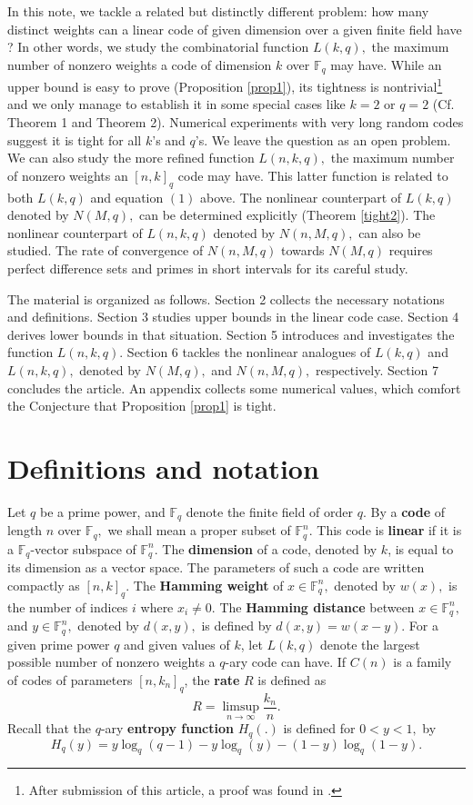 \documentclass[12pt]{article}
\newcommand{\F}{\mathbb{F}}
\theoremstyle{definition}
\begin{document}
 In this note, we tackle a related but distinctly different problem:
how many distinct weights can a linear code of given dimension over a given finite field have ? In other words, we study the combinatorial function $L(k,q),$ the maximum number
of nonzero weights a code of dimension $k$ over $\F_q$ may have. While an upper bound is easy to prove (Proposition \ref{prop1}),
its tightness is nontrivial\footnote{ After submission of this article, a proof was found in \cite{proof}.} and we only manage to establish it in some special cases like $k=2$ or $q=2$
(Cf. Theorem 1 and Theorem 2). Numerical experiments with very long random codes suggest it is tight for all $k$'s and $q$'s. We leave the question as an open problem.
We can also study the more refined function $L(n,k,q),$ the maximum number of nonzero weights an $[n,k]_q$ code may have. This latter function is related to both $L(k,q)$ and
equation $(1)$ above.
The nonlinear counterpart of $L(k,q)$ denoted by  $N(M,q),$ can be determined explicitly (Theorem \ref{tight2}). The nonlinear counterpart of $L(n,k,q)$ denoted by  $N(n,M,q),$
can also be studied. The rate of convergence of $N(n,M,q)$ towards $N(M,q)$ requires perfect difference sets \cite{BJL} and primes in short intervals \cite{BHP} for its careful study.

The material is organized as follows. Section 2 collects the necessary notations and definitions. Section 3 studies upper bounds in the linear code case.
Section 4 derives lower bounds in that situation. Section 5 introduces and investigates the function $L(n,k,q).$
Section 6 tackles the nonlinear analogues of $L(k,q)$ and $L(n,k,q),$ denoted by $N(M,q),$ and $N(n,M,q),$ respectively. Section 7 concludes the article.
An appendix collects some numerical values, which comfort the Conjecture that Proposition \ref{prop1} is tight.
\section{Definitions and notation}
Let $q$ be a prime power, and $\F_q$ denote the finite field of order $q.$
By a {\bf code} of length $n$ over $\F_q,$ we shall mean a proper subset of $\F_q^n.$ This code is {\bf linear} if it is a  $\F_q$-vector subspace of $\F_q^n.$
 The {\bf dimension} of a code, denoted by $k$, is equal to its dimension as a vector space. The parameters of such a code are written compactly as $[n,k]_q.$
The {\bf Hamming weight}  of $x\in \F_q^n,$ denoted by $w(x),$ is the number of indices $i$ where $x_i \neq 0.$
The {\bf Hamming distance}  between $x\in \F_q^n,$ and $y \in \F_q^n,$ denoted by $d(x,y),$ is defined by $d(x,y)=w(x-y).$
For a given prime power $q$ and given values of $k$, let {\bf $L(k,q)$} denote the largest possible number of nonzero weights a $q$-ary code can have.
If $C(n)$ is a family of codes of parameters $[n, k_n]_q$, the {\bf rate} $R$ is defined as $$R=\limsup\limits_{n \rightarrow \infty}\frac{k_n}{n}.$$
Recall that the $q$-ary {\bf entropy function} $H_q(.)$ is defined for $0<y< 1,$ by $$ H_q(y)=y\log_q(q-1)-y\log_q(y)-(1-y)\log_q(1-y).$$
\end{document}
